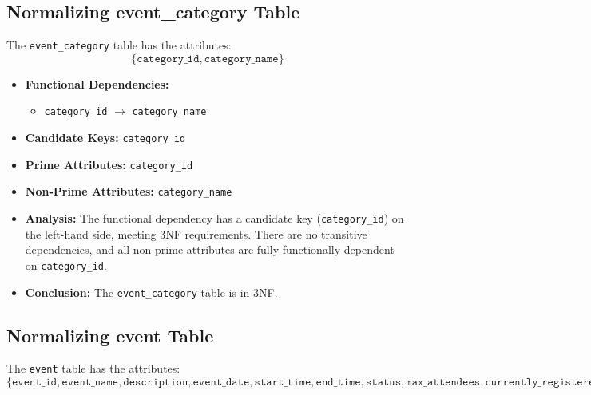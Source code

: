 \subsection{Normalizing event\_category Table}

The \texttt{event\_category} table has the attributes:
\[
\{ \texttt{category\_id}, \texttt{category\_name} \}
\]

\begin{itemize}
    \item \textbf{Functional Dependencies:}
    \begin{itemize}
        \item \texttt{category\_id} $\rightarrow$ \texttt{category\_name}
    \end{itemize}

    \item \textbf{Candidate Keys:} \texttt{category\_id}

    \item \textbf{Prime Attributes:} \texttt{category\_id}

    \item \textbf{Non-Prime Attributes:} \texttt{category\_name}

    \item \textbf{Analysis:} The functional dependency has a candidate key (\texttt{category\_id}) on the left-hand side, meeting 3NF requirements. There are no transitive dependencies, and all non-prime attributes are fully functionally dependent on \texttt{category\_id}.

    \item \textbf{Conclusion:} The \texttt{event\_category} table is in 3NF.
\end{itemize}

\subsection{Normalizing event Table}

The \texttt{event} table has the attributes:
\[
\{ \texttt{event\_id}, \texttt{event\_name}, \texttt{description}, \texttt{event\_date}, \texttt{start\_time}, \texttt{end\_time}, \texttt{status}, \texttt{max\_attendees}, \texttt{currently\_registered}, \texttt{category\_id}, \texttt{location\_id} \}
\]


